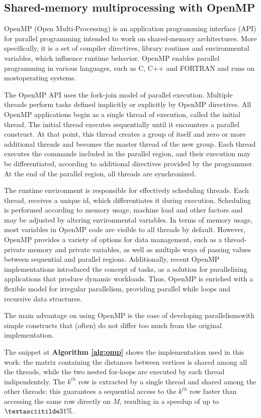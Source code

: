 \subsection{Shared-memory multiprocessing with OpenMP}
OpenMP (Open Multi-Processing) is an application programming
interface (API) for parallel programming intended to work on shared-memory architectures. More specifically, it is a set of compiler
directives, library routines and environmental variables, which influence runtime behavior. OpenMP enables parallel programming in
various languages, such as C, C++ and FORTRAN and runs on mostoperating systems. \par
The OpenMP API uses the fork-join model of parallel execution.
Multiple threads perform tasks defined implicitly or explicitly by OpenMP directives. All OpenMP applications begin as a single thread
of execution, called the initial thread. The initial thread executes sequentially until it encounters a parallel construct. At that point,
this thread creates a group of itself and zero or more additional threads and becomes the master thread of the new group. Each thread
executes the commands included in the parallel region, and their execution may be differentiated, according to additional directives
provided by the programmer. At the end of the parallel region, all threads are synchronized. \par
The runtime environment is responsible for effectively scheduling threads. Each thread, receives a unique id, which differentiates it
during execution. Scheduling is performed according to memory usage, machine load and other factors and may be adjusted by altering
environmental variables. In terms of memory usage, most variables in OpenMP code are visible to all threads by default. 
However, OpenMP provides a variety of options for data management, such as a thread-private memory and private variables, as well as multiple ways of
passing values between sequential and parallel regions. Additionally, recent OpenMP implementations introduced the concept of tasks,
as a solution for parallelizing applications that produce dynamic workloads. 
Thus, OpenMP is enriched with a flexible model for irregular parallelism, providing parallel while loops and recursive data structures. \par
The main advantage on using OpenMP is the ease of developing parallelismswith simple constructs that (often) do not differ too much from the original implementation.

The snippet at \textbf{Algorithm \ref*{alg:omp}} shows the implementation used in this work: the matrix containing the
distances between vertices is shared among all the threads, while the two nested for-loops are executed
by each thread indipendentely. The $k^{th}$ row is extracted by a single thread and shared among the other threads: this
guarantees a sequential access to the $k^{th}$ row faster than accessing the same row directly on $M$, resulting in a speedup of up to $\textasciitilde31\%$.

